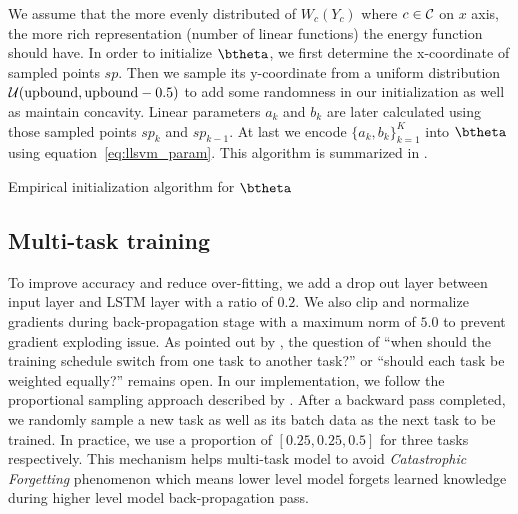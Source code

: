 \documentclass[sigconf]{acmart}
\renewcommand{\citename}{\citet}
\begin{document}
We assume that the more evenly distributed of $W_c(Y_c)$ where
$c\in\cal C$ on $x$ axis, the more rich representation (number of
linear functions) the energy function should have. In order to
initialize $\btheta$, we first determine the x-coordinate of
sampled points $sp$. Then we sample its y-coordinate from a
uniform distribution ${\cal U}(\text{upbound},\text{upbound}-0.5)$ to add some
randomness in our initialization as well as maintain concavity.
Linear parameters $a_k$ and $b_k$ are later calculated using
those sampled points $sp_k$ and $sp_{k-1}$. At last we encode
$\{a_k,b_k\}_{k=1}^K$ into $\btheta$ using
equation~\eqref{eq:llsvm_param}. This algorithm is summarized in
.

\begin{algorithm}[h]
  \begin{algorithmic}[1]
       
    \ENDIF
    \ENDFOR
     
  \end{algorithmic}
  \caption{\label{alg:init_theta} Empirical initialization
    algorithm for $\btheta$}
\end{algorithm}

\subsection{Multi-task training}
\label{sec:multi_train}

To improve accuracy and reduce over-fitting, we add a drop out
layer between input layer and LSTM layer with a ratio of $0.2$.
We also clip and normalize gradients during back-propagation
stage with a maximum norm of $5.0$ to prevent gradient exploding
issue. As pointed out by \citename{lample2016neural}, the
question of ``when should the training schedule switch from one
task to another task?'' or ``should each task be weighted
equally?'' remains open. In our implementation, we follow the
proportional sampling approach described by
\citename{sogaard2016deep}. After a backward pass completed, we
randomly sample a new task as well as its batch data as the next
task to be trained. In practice, we use a proportion of
$[0.25,0.25,0.5]$ for three tasks respectively. This mechanism
helps multi-task model to avoid \emph{Catastrophic Forgetting}
phenomenon which means lower level model forgets learned
knowledge during higher level model back-propagation pass.
\end{document}
